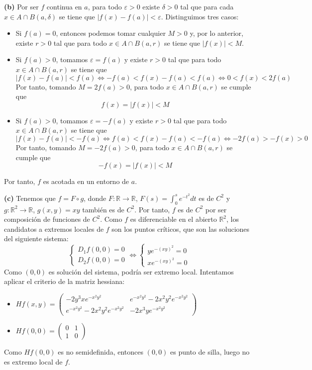 \documentclass[12pt]{report}
\newcommand{\R}{\mathbb R}
\begin{document}
\vspace{2mm}
\textbf{(b) } Por ser $f$ continua en $a$, para todo $\varepsilon > 0$ existe $\delta > 0$ tal que para cada $x \in A \cap B(a, \delta)$ se tiene que $|f(x) - f(a)| < \varepsilon$. Distinguimos tres casos:
\begin{itemize}
    \item Si $f(a) = 0$, entonces podemos tomar cualquier $M > 0$ y, por lo anterior, existe $r > 0$ tal que para todo $x \in A \cap B(a, r)$ se tiene que $|f(x)| < M$.
    \item Si $f(a) > 0$, tomamos $\varepsilon = f(a)$ y existe $r > 0$ tal que para todo $x \in A \cap B(a,r)$ se tiene que
    \[|f(x)-f(a)| < f(a) \iff -f(a) < f(x)-f(a) < f(a) \iff 0 < f(x) < 2f(a)\]
    Por tanto, tomando $M = 2f(a) > 0$, para todo $x \in A \cap B(a,r)$ se cumple que
    \[f(x) = |f(x)| < M\]
    \item Si $f(a) > 0$, tomamos $\varepsilon = -f(a)$ y existe $r > 0$ tal que para todo $x \in A \cap B(a,r)$ se tiene que
    \[|f(x)-f(a)| < -f(a) \iff f(a) < f(x)-f(a) < -f(a) \iff -2f(a) > -f(x) > 0\]
    Por tanto, tomando $M = -2f(a) > 0$, para todo $x \in A \cap B(a,r)$ se cumple que
    \[-f(x) = |f(x)| < M\]
\end{itemize}
Por tanto, $f$ es acotada en un entorno de $a$.

\vspace{2mm}
\textbf{(c)} Tenemos que $f = F \circ g$, donde $F \colon \R \to \R$, $F(s) = \int_0^s e^{-t^2}dt$ es de $C^2$ y $g \colon \R^2 \to \R$, $g(x,y) = xy$ también es de $C^2$. Por tanto, $f$ es de $C^2$ por ser composición de funciones de $C^2$. Como $f$ es diferenciable en el abierto $\R^2$, los candidatos a extremos locales de $f$ son los puntos críticos, que son las soluciones del siguiente sistema:
\[
\begin{cases}
    D_1f(0,0) = 0 \\
    D_2f(0,0) = 0
\end{cases} \iff \begin{cases}
    ye^{-(xy)^2} = 0 \\
    xe^{-(xy)^2} = 0
\end{cases}
\]
Como $(0,0)$ es solución del sistema, podría ser extremo local. Intentamos aplicar el criterio de la matriz hessiana:
\begin{itemize}
    \item $\displaystyle Hf(x,y) = 
    \begin{pmatrix}
    -2y^3xe^{-x^2y^2} & e^{-x^2y^2}-2x^2y^2e^{-x^2y^2} \\
    e^{-x^2y^2}-2x^2y^2e^{-x^2y^2} & -2x^3ye^{-x^2y^2}
    \end{pmatrix}
    $
    \item $\displaystyle Hf(0,0) = 
    \begin{pmatrix}
    0 & 1 \\
    1 & 0
    \end{pmatrix}
    $
\end{itemize}
Como  $Hf(0,0)$ es no semidefinida, entonces $(0,0)$ es punto de silla, luego no es extremo local de $f$.
\end{document}
